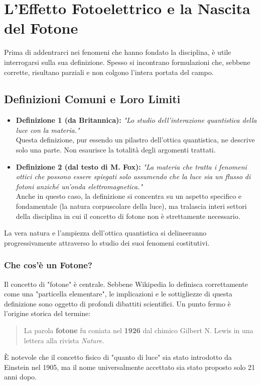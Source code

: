 \section{L'Effetto Fotoelettrico e la Nascita del Fotone}

Prima di addentrarci nei fenomeni che hanno fondato la disciplina, è utile interrogarsi sulla sua definizione. Spesso si incontrano formulazioni che, sebbene corrette, risultano parziali e non colgono l'intera portata del campo.

\subsection{Definizioni Comuni e Loro Limiti}
\begin{itemize}
    \item \textbf{Definizione 1 (da Britannica):} \textit{"Lo studio dell'interazione quantistica della luce con la materia."} \\
    Questa definizione, pur essendo un pilastro dell'ottica quantistica, ne descrive solo una parte. Non esaurisce la totalità degli argomenti trattati.

    \item \textbf{Definizione 2 (dal testo di M. Fox):} \textit{"La materia che tratta i fenomeni ottici che possono essere spiegati solo assumendo che la luce sia un flusso di fotoni anziché un'onda elettromagnetica."} \\
    Anche in questo caso, la definizione si concentra su un aspetto specifico e fondamentale (la natura corpuscolare della luce), ma tralascia interi settori della disciplina in cui il concetto di fotone non è strettamente necessario.
\end{itemize}
La vera natura e l'ampiezza dell'ottica quantistica si delineeranno progressivamente attraverso lo studio dei suoi fenomeni costitutivi.

\subsubsection*{Che cos'è un Fotone?}
Il concetto di "fotone" è centrale. Sebbene Wikipedia lo definisca correttamente come una "particella elementare", le implicazioni e le sottigliezze di questa definizione sono oggetto di profondi dibattiti scientifici.
Un punto fermo è l'origine storica del termine:
\begin{quote}
    La parola \textbf{fotone} fu coniata nel \textbf{1926} dal chimico Gilbert N. Lewis in una lettera alla rivista \textit{Nature}.
\end{quote}
È notevole che il concetto fisico di "quanto di luce" sia stato introdotto da Einstein nel 1905, ma il nome universalmente accettato sia stato proposto solo 21 anni dopo.

